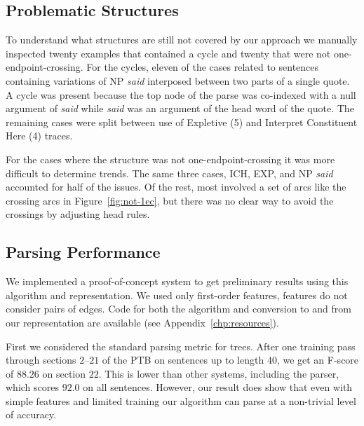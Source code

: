 \subsection{Problematic Structures}

To understand what structures are still not covered by our approach we manually inspected twenty examples that contained a cycle and twenty that were not one-endpoint-crossing.
For the cycles, eleven of the cases related to sentences containing variations of NP \emph{said} interposed between two parts of a single quote.
A cycle was present because the top node of the parse was co-indexed with a null argument of \emph{said} while \emph{said} was an argument of the head word of the quote.
The remaining cases were split between use of Expletive (5) and Interpret Constituent Here (4) traces.

For the cases where the structure was not one-endpoint-crossing it was more difficult to determine trends.
The same three cases, ICH, EXP, and NP \emph{said} accounted for half of the issues.
Of the rest, most involved a set of arcs like the crossing arcs in Figure~\ref{fig:not-1ec}, but there was no clear way to avoid the crossings by adjusting head rules.

\subsection{Parsing Performance}

We implemented a proof-of-concept system to get preliminary results using this algorithm and representation.
We used only first-order features, \myie features do not consider pairs of edges.
Code for both the algorithm and conversion to and from our representation are available (see Appendix~\ref{chp:resources}).

First we considered the standard parsing metric for trees.
After one training pass through sections $2$--$21$ of the PTB on sentences up to length $40$, we get an F-score of $88.26$ on section $22$.
This is lower than other systems, including the \textcite{cck} parser, which scores $92.0$ on all sentences.
However, our result does show that even with simple features and limited training our algorithm can parse at a non-trivial level of accuracy.


